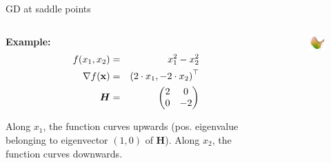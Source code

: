 \documentclass[11pt,compress,t,notes=noshow, xcolor=table]{beamer}
\begin{document}

\begin{vbframe}{GD at saddle points}
	
	\begin{columns}
		\begin{column}{0.48\textwidth}
			\textbf{Example: }
			\begin{eqnarray*}
				f(x_1, x_2) &=& x_1^2 - x_2^2 \\
				\nabla f(\mathbf{x}) &=& \left(2 \cdot x_1, - 2 \cdot x_2\right)^\top \\
				\bm{H} &=& \begin{pmatrix} 2 & 0 \\ 0 & - 2\end{pmatrix}
			\end{eqnarray*}

			Along $x_1$, the function curves upwards (pos. eigenvalue belonging to eigenvector $(1, 0)$ of $\bm{H}$). Along $x_2$, the function curves downwards. 
			
		\end{column}
		\begin{column}{0.48\textwidth}
			\begin{figure}
				\centering
				\includegraphics[width=4cm]{figure_man/saddlepoint.png}
			\end{figure} 
		\end{column}	
	\end{columns}
	
\end{vbframe}

\end{document}
